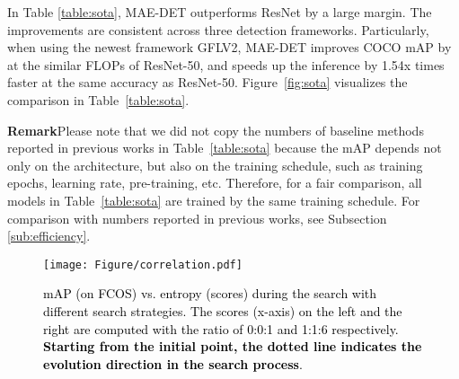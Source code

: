\documentclass[nohyperref]{article}
\theoremstyle{plain}
\theoremstyle{definition}
\theoremstyle{remark}
\begin{document}
In Table \ref{table:sota}, MAE-DET outperforms ResNet by a large margin. The improvements are consistent across three detection frameworks. Particularly, when using the newest framework GFLV2, MAE-DET improves COCO mAP by  at the similar FLOPs of ResNet-50, and speeds up the inference by 1.54x times faster at the same accuracy as ResNet-50. Figure~\ref{fig:sota} visualizes the comparison in Table~\ref{table:sota}.

\noindent \textbf{Remark}Please note that we did not copy the numbers of baseline methods reported in previous works in Table~\ref{table:sota} because the mAP depends not only on the architecture, but also on the training schedule, such as training epochs, learning rate, pre-training, etc. Therefore, for a fair comparison, all models in Table~\ref{table:sota} are trained by the same training schedule. For comparison with numbers reported in previous works, see Subsection \ref{sub:efficiency}.

\begin{figure*}[h]
	\centering
	\texttt{[image: Figure/correlation.pdf]}
	\caption{\textcolor{black}{mAP (on FCOS) vs. entropy (scores) during the search with different search strategies. The scores (x-axis) on the left and the right are computed with the ratio of 0:0:1 and 1:1:6 respectively. \textbf{Starting from the initial point, the dotted line indicates the evolution direction in the search process}.}}
	\label{fig:corre}
\end{figure*}
\end{document}
